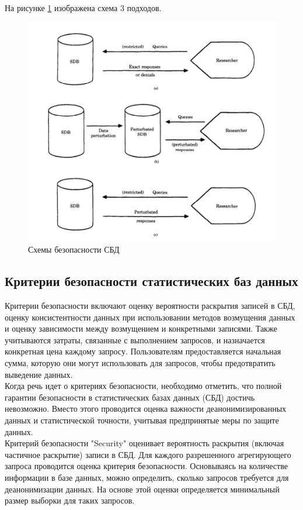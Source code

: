 На рисунке \ref{fig:SDB_secure} изображена схема 3 подходов.
\begin{figure}[h]
\centering
\includegraphics[width=1\linewidth]{assets/text.png}
\caption{Схемы безопасности СБД}
\label{fig:SDB_secure}
\end{figure}

\subsection{Критерии безопасности статистических баз данных}

Критерии безопасности включают оценку вероятности раскрытия записей в СБД, оценку консистентности данных при использовании методов возмущения данных и оценку зависимости между возмущением и конкретными записями. Также учитываются затраты, связанные с выполнением запросов, и назначается конкретная цена каждому запросу. Пользователям предоставляется начальная сумма, которую они могут использовать для запросов, чтобы предотвратить выведение данных.
\\

Когда речь идет о критериях безопасности, необходимо отметить, что полной гарантии безопасности в статистических базах данных (СБД) достичь невозможно. Вместо этого проводится оценка важности деанонимизированных данных и статистической точности, учитывая предпринятые меры по защите данных.
\\

Критерий безопасности "Security" оценивает вероятность раскрытия (включая частичное раскрытие) записи в СБД. Для каждого разрешенного агрегирующего запроса проводится оценка критерия безопасности. Основываясь на количестве информации в базе данных, можно определить, сколько запросов требуется для деанонимизации данных. На основе этой оценки определяется минимальный размер выборки для таких запросов.
\\

